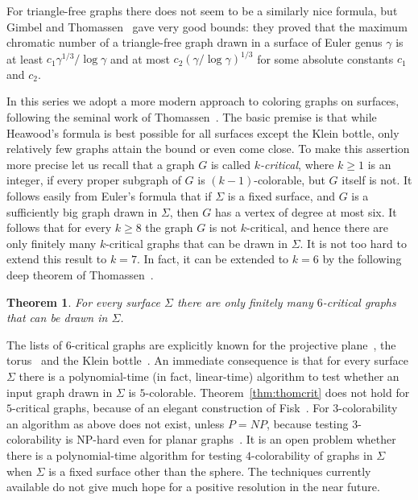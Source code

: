 \documentclass{article}
\def\rt#1{#1}
\def\mylabel#1{{\label{#1}}}
\newtheorem{theorem}{Theorem}
\begin{document}
For triangle-free graphs there does not seem to be a similarly nice formula,
but Gimbel and Thomassen~\cite{gimbel} gave very good bounds: they
proved that the maximum chromatic number of a triangle-free graph drawn
in a surface of Euler genus $\gamma$ is at least $c_1 \gamma^{1/3}/\log \gamma$
and at most $c_2(\gamma/\log \gamma)^{1/3}$ for some absolute constants 
$c_1$ and $c_2$.

In this series we adopt a more modern approach to coloring graphs on surfaces,
following the seminal work of 
Thomassen~\cite{Tho5torus,ThoCritical,thom-surf}.
The basic premise is that while Heawood's formula is best possible
for all surfaces except the Klein bottle, only relatively few graphs attain
the bound or even come close.
To make this assertion more precise let us recall that a graph $G$ is
called {\em $k$-critical}, where $k\ge1$ is an integer, if every proper
subgraph of $G$ is $(k-1)$-colorable, but $G$ itself is not.
It follows easily from Euler's formula that if $\Sigma$ is a fixed surface,
and $G$ is a sufficiently big graph drawn in $\Sigma$, then $G$ has 
a vertex of degree at most six. 
It follows that for every $k\ge8$ the graph $G$ is not $k$-critical,
and hence there
are only finitely many $k$-critical graphs that can be drawn in $\Sigma$.
It is not too hard to extend this result to $k=7$.
In fact, it can be extended to $k=6$ by the following deep theorem
of Thomassen~\cite{ThoCritical}.

\begin{theorem}
\mylabel{thm:thomcrit}
For every surface $\Sigma$ there are only finitely many $6$-critical 
graphs that can be drawn in $\Sigma$.
\end{theorem}

\noindent
The lists of $6$-critical graphs are explicitly known for the
projective plane~\cite{AlbHut}, the torus~\cite{Tho5torus} and the 
Klein bottle~\cite{ChePosStrThoYer,KawKraKynLid}.
An immediate consequence is that for every surface $\Sigma$ there is
a polynomial-time (in fact, linear-time) algorithm to test whether
an input graph drawn in $\Sigma$ is $5$-colorable.
Theorem~\ref{thm:thomcrit} does not hold for $5$-critical graphs,
because of an elegant construction of Fisk~\cite{Fis}.
For $3$-colorability an algorithm as above does not exist, unless $P=NP$,
because testing $3$-colorability is NP-hard even for planar 
graphs~\cite{GarJoh}.
It is an open problem whether there is a polynomial-time algorithm for testing
$4$-colorability of graphs in $\Sigma$ when $\Sigma$ is a fixed
surface other than \rt{the} sphere.
The techniques currently available do not give much hope for a positive
resolution in the near future. 
\end{document}
